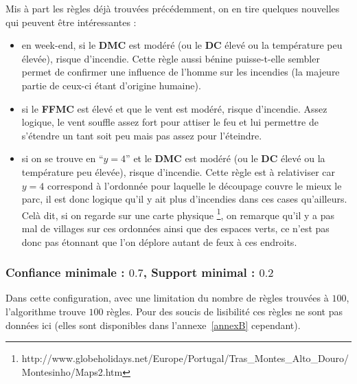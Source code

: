 \documentclass{article}
\begin{document}
\begin{sffamily}
Mis à part les règles déjà trouvées précédemment, on en tire quelques nouvelles qui peuvent être intéressantes :
\begin{itemize}
\item en week-end, si le \textbf{DMC} est modéré (ou le \textbf{DC} élevé ou la température peu élevée), risque d'incendie. Cette règle aussi bénine 
puisse-t-elle sembler permet de confirmer une influence 
de l'homme sur les incendies (la majeure partie de ceux-ci étant d'origine humaine).
\item si le \textbf{FFMC} est élevé et que le vent est modéré, risque d'incendie. Assez logique, le vent souffle assez fort pour attiser le feu et 
lui permettre de s'étendre un tant soit peu mais pas assez pour l'éteindre.
\item si on se trouve en ``$y=4$'' et le \textbf{DMC} est modéré (ou le \textbf{DC} élevé ou la température peu élevée), risque d'incendie. Cette 
règle est à relativiser car $y=4$ correspond à l'ordonnée pour laquelle le découpage couvre le mieux le parc, il est donc logique qu'il y ait plus 
d'incendies dans ces cases qu'ailleurs. Celà dit, si on regarde sur une carte physique 
\footnote{http://www.globeholidays.net/Europe/Portugal/Tras\_Montes\_Alto\_Douro/Montesinho/Maps2.htm}, on remarque qu'il y a pas mal de villages sur 
ces ordonnées ainsi que des espaces verts, ce n'est pas donc pas étonnant que l'on déplore autant de feux à ces endroits.

\end{itemize}

\subsubsection*{Confiance minimale : $0.7$, Support minimal : $0.2$}

Dans cette configuration, avec une limitation du nombre de règles trouvées à $100$, l'algorithme trouve $100$ règles. Pour des soucis de lisibilité 
ces règles ne sont pas données ici (elles sont disponibles dans l'annexe~\ref{annexB} cependant). \\


\end{sffamily}
\end{document}
